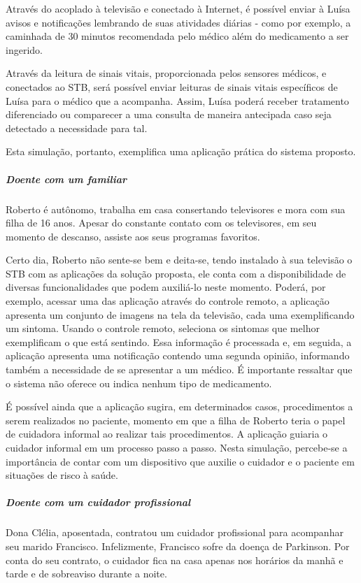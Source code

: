 Através do \stb[] acoplado à televisão e conectado à Internet, é
possível enviar à Luísa avisos e notificações lembrando de suas atividades
diárias - como por exemplo, a caminhada de 30 minutos recomendada pelo
médico além do medicamento a ser ingerido.

Através da leitura de sinais vitais, proporcionada pelos sensores médicos,
e conectados ao STB, será possível enviar leituras de sinais vitais específicos 
de Luísa para o médico que a acompanha. Assim, Luísa poderá receber tratamento
diferenciado ou comparecer a uma consulta de maneira antecipada caso seja
detectado a necessidade para tal.

Esta simulação, portanto, exemplifica uma aplicação prática do sistema 
proposto.

\subparagraph{Doente com um familiar}

Roberto é autônomo, trabalha em casa consertando televisores e mora com sua
filha de 16 anos. Apesar do constante contato com os televisores, em seu momento
de descanso, assiste aos seus programas favoritos.

Certo dia, Roberto não sente-se bem e deita-se, tendo instalado à sua televisão
o STB com as aplicações da solução proposta, ele conta com a disponibilidade de
diversas funcionalidades que podem auxiliá-lo neste momento. Poderá, por
exemplo, acessar uma das aplicação através do controle remoto, a aplicação
apresenta um conjunto de imagens na tela da televisão, cada uma exemplificando
um sintoma.  Usando o controle remoto, seleciona os sintomas que melhor
exemplificam o que está sentindo. Essa informação é processada e, em seguida, a
aplicação apresenta uma notificação contendo uma segunda opinião, informando
também a necessidade de se apresentar a um médico. É importante ressaltar que
o sistema não oferece ou indica nenhum tipo de medicamento.

É possível ainda que a aplicação sugira, em determinados casos, procedimentos a
serem realizados no paciente, momento em que a filha de Roberto teria o papel de
cuidadora informal ao realizar tais procedimentos. A aplicação guiaria o
cuidador informal em um processo passo a passo. Nesta simulação,  percebe-se a
importância de contar com um dispositivo que auxilie o cuidador e o paciente em
situações de risco à saúde.

\subparagraph{Doente com um cuidador profissional}

Dona Clélia, aposentada, contratou um cuidador profissional para acompanhar seu
marido Francisco. Infelizmente, Francisco sofre da doença de Parkinson. Por conta
do seu contrato, o cuidador fica na casa apenas nos horários da manhã e tarde e 
de sobreaviso durante a noite.

